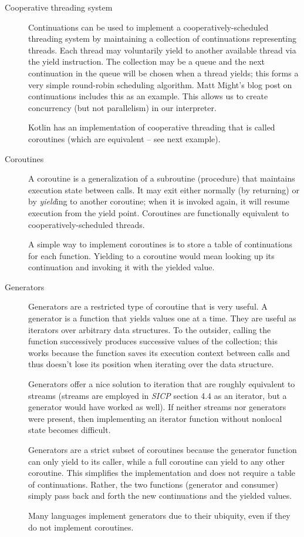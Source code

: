 \documentclass[]{article}
\begin{document}
\begin{description}
  
\item[Cooperative threading system] Continuations can be used to implement a cooperatively-scheduled threading system by maintaining a collection of continuations representing threads. Each thread may voluntarily yield to another available thread via the yield instruction. The collection may be a queue and the next continuation in the queue will be chosen when a thread yields; this forms a very simple round-robin scheduling algorithm. Matt Might's blog post on continuations includes this as an example. This allows us to create concurrency (but not parallelism) in our interpreter.

  Kotlin has an implementation of cooperative threading that is called coroutines (which are equivalent -- see next example).
  
\item[Coroutines] A coroutine is a generalization of a subroutine (procedure) that maintains execution state between calls. It may exit either normally (by returning) or by \textit{yield}ing to another coroutine; when it is invoked again, it will resume execution from the yield point. Coroutines are functionally equivalent to cooperatively-scheduled threads.

  A simple way to implement coroutines is to store a table of continuations for each function. Yielding to a coroutine would mean looking up its continuation and invoking it with the yielded value.
  
\item[Generators] Generators are a restricted type of coroutine that is very useful. A generator is a function that yields values one at a time. They are useful as iterators over arbitrary data structures. To the outsider, calling the function successively produces successive values of the collection; this works because the function saves its execution context between calls and thus doesn't lose its position when iterating over the data structure.

  Generators offer a nice solution to iteration that are roughly equivalent to streams (streams are employed in \textit{SICP} section 4.4 as an iterator, but a generator would have worked as well). If neither streams nor generators were present, then implementing an iterator function without nonlocal state becomes difficult.

  Generators are a strict subset of coroutines because the generator function can only yield to its caller, while a full coroutine can yield to any other coroutine. This simplifies the implementation and does not require a table of continuations. Rather, the two functions (generator and consumer) simply pass back and forth the new continuations and the yielded values.

  Many languages implement generators due to their ubiquity, even if they do not implement coroutines.
\end{description}
\end{document}
